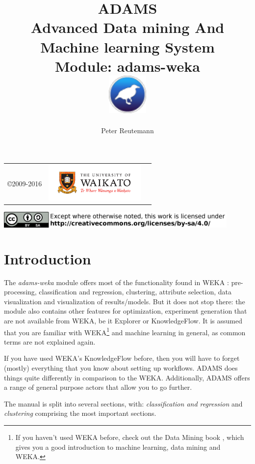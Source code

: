 \documentclass[a4paper]{book}
\title{
  \textbf{ADAMS} \\
  {\Large \textbf{A}dvanced \textbf{D}ata mining \textbf{A}nd \textbf{M}achine
  learning \textbf{S}ystem} \\
  {\Large Module: adams-weka} \\
  \vspace{1cm}
  \includegraphics[width=2cm]{images/weka-module.png} \\
}
\author{
  Peter Reutemann
}
\begin{document}
\begin{titlepage}
\maketitle

\thispagestyle{empty}
\center
\begin{table}[b]
	\begin{tabular}{c l l}
		\parbox[c][2cm]{2cm}{\copyright 2009-2016} &
		\parbox[c][2cm]{5cm}{\includegraphics[width=5cm]{images/coat_of_arms.pdf}} \\
	\end{tabular}
	\includegraphics[width=12cm]{images/cc.png} \\
\end{table}

\end{titlepage}

\tableofcontents
\listoffigures

\chapter{Introduction}
The \textit{adams-weka} module offers most of the functionality found in WEKA
\cite{weka}: pre-processing, classification and regression, clustering,
attribute selection, data visualization and visualization of results/models.
But it does not stop there: the module also contains other features for
optimization, experiment generation that are not available from WEKA, be it
Explorer or KnowledgeFlow. It is assumed that you are familiar with
WEKA\footnote{If you haven't used WEKA before, check out the Data Mining book
\cite{wekabook}, which gives you a good introduction to machine learning, data
mining and WEKA.} and machine learning in general, as common terms are not
explained again.

If you have used WEKA's KnowledgeFlow before, then you will have to forget
(mostly) everything that you know about setting up workflows. ADAMS does things
quite differently in comparison to the WEKA. Additionally, ADAMS offers a range
of general purpose actors that allow you to go further.

The manual is split into several sections, with: \textit{classification and regression}
and \textit{clustering} comprising the most important sections.














\end{document}
